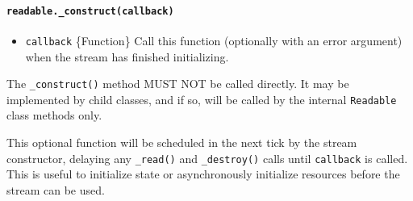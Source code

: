 \begin{Shaded}
\begin{Highlighting}[]
\OperatorTok{=} \NormalTok{(}\NormalTok{)}\OperatorTok{;}
\OperatorTok{=}  \NormalTok{()}\OperatorTok{;}
\OperatorTok{=}  \NormalTok{(\{}
\NormalTok{  \}}\OperatorTok{,}
  \OperatorTok{:}\OperatorTok{,}
\NormalTok{\})}\OperatorTok{;}
\NormalTok{()}\OperatorTok{;}
\end{Highlighting}
\end{Shaded}

\paragraph{\texorpdfstring{\texttt{readable.\_construct(callback)}}{readable.\_construct(callback)}}\label{readable._constructcallback}

\begin{itemize}
\tightlist
\item
  \texttt{callback} \{Function\} Call this function (optionally with an
  error argument) when the stream has finished initializing.
\end{itemize}

The \texttt{\_construct()} method MUST NOT be called directly. It may be
implemented by child classes, and if so, will be called by the internal
\texttt{Readable} class methods only.

This optional function will be scheduled in the next tick by the stream
constructor, delaying any \texttt{\_read()} and \texttt{\_destroy()}
calls until \texttt{callback} is called. This is useful to initialize
state or asynchronously initialize resources before the stream can be
used.

